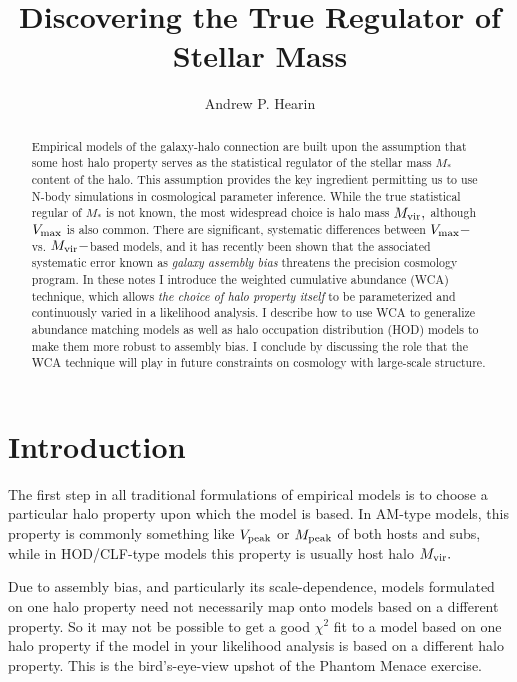 \documentclass[usenatbib,usegraphicx,letterpaper]{mn2e}
\newcommand{\vmax}{V_{\rm max}}
\newcommand{\mvir}{M_{\rm vir}}
\newcommand{\mpeak}{M_{\rm peak}}
\newcommand{\vpeak}{V_{\rm peak}}
\newcommand{\mstar}{M_{\ast}}
\begin{document}
\title[Generalized Galaxy-Halo Modeling]
{Discovering the True Regulator of Stellar Mass}

\author[A.P. Hearin]{Andrew P. Hearin}

\maketitle




\begin{abstract}
Empirical models of the galaxy-halo connection are built upon the assumption that some host halo property serves as the statistical regulator of the stellar mass $\mstar$ content of the halo. This assumption provides the key ingredient permitting us to use N-body simulations in cosmological parameter inference. While the true statistical regular of $\mstar$ is not known, the most widespread choice is halo mass $\mvir,$ although $\vmax$ is also common. There are significant, systematic differences between $\vmax-$ vs. $\mvir-$based models, and it has recently been shown that the associated systematic error known as {\em galaxy assembly bias} threatens the precision cosmology program. In these notes I introduce the weighted cumulative abundance (WCA) technique, which allows {\em the choice of halo property itself} to be parameterized and continuously varied in a likelihood analysis. I describe how to use WCA to  generalize abundance matching models as well as halo occupation distribution (HOD) models to make them more robust to assembly bias. I conclude by discussing the role that the WCA technique will play in future constraints on cosmology with large-scale structure. 
\end{abstract}


\section{Introduction}

The first step in all traditional formulations of empirical models is to choose a particular halo property upon which the model is based. In AM-type models, this property is commonly something like $\vpeak$ or $\mpeak$ of both hosts and subs, while in HOD/CLF-type models this property is usually host halo $\mvir.$ 

Due to assembly bias, and particularly its scale-dependence, models formulated on one halo property need not necessarily map onto models based on a different property. So it may not be possible to get a good $\chi^2$ fit to a model based on one halo property if the model in your likelihood analysis is based on a different halo property. This is the bird's-eye-view upshot of the Phantom Menace exercise. 
\end{document}
